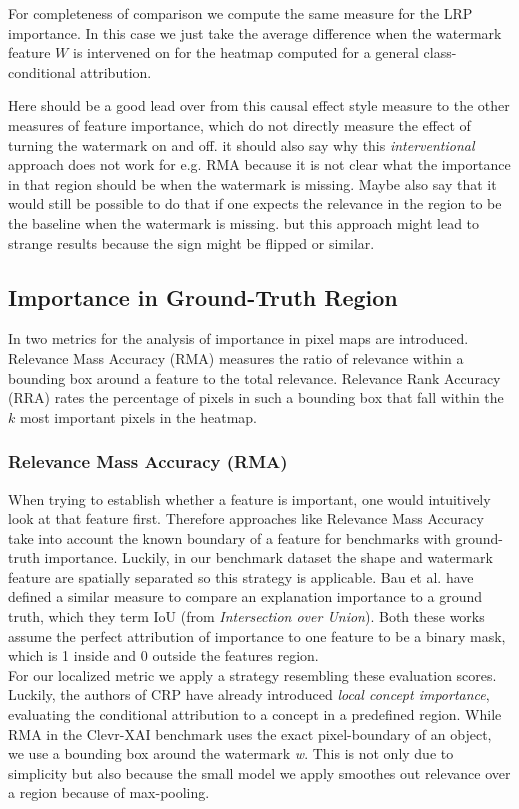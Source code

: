 For completeness of comparison we compute the same measure for the LRP importance. In this case we just take the average difference when the watermark feature $W$ is intervened on for the heatmap computed for a general class-conditional attribution. 

Here should be a good lead over from this causal effect style measure to the other measures of feature importance, which do not directly measure the effect of turning the watermark on and off. it should also say why this \textit{interventional} approach does not work for e.g. RMA because it is not clear what the importance in that region should be when the watermark is missing. Maybe also say that it would still be possible to do that if one expects the relevance in the region to be the baseline when the watermark is missing. but this approach might lead to strange results because the sign might be flipped or similar.

\subsection{Importance in Ground-Truth Region}
In \cite{Arras2022} two metrics for the analysis of importance in pixel maps are introduced. Relevance Mass Accuracy (RMA) measures the ratio of relevance within a bounding box around a feature to the total relevance. Relevance Rank Accuracy (RRA) rates the percentage of pixels in such a bounding box that fall within the $k$ most important pixels in the heatmap.

\subsubsection{Relevance Mass Accuracy (RMA)}
When trying to establish whether a feature is important, one would intuitively look at that feature first. Therefore approaches like Relevance Mass Accuracy take into account the known boundary of a feature for benchmarks with ground-truth importance. Luckily, in our benchmark dataset the shape and watermark feature are spatially separated so this strategy is applicable.
Bau et al. \cite{Bau2017, Bau2020} have defined a similar measure to compare an explanation importance to a ground truth, which they term IoU (from \textit{Intersection over Union}). Both these works assume the perfect attribution of importance to one feature to be a binary mask, which is 1 inside and 0 outside the features region. \\

For our localized metric we apply a strategy resembling these evaluation scores. 
Luckily, the authors of CRP have already introduced \textit{local concept importance}, evaluating the conditional attribution to a concept in a predefined region. 
While RMA in the Clevr-XAI benchmark uses the exact pixel-boundary of an object, we use a bounding box around the watermark \textit{w}. This is not only due to simplicity but also because the small model we apply smoothes out relevance over a region because of max-pooling. \\

